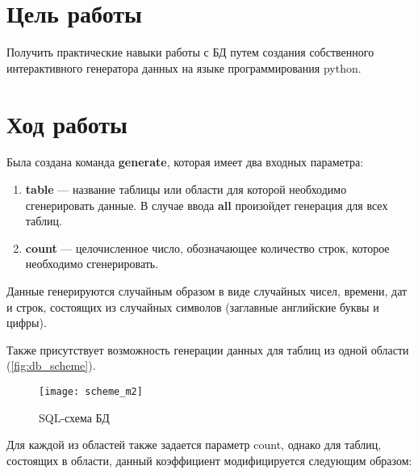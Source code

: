 \section{Цель работы}
Получить практические навыки работы с БД путем создания собственного интерактивного генератора
данных на языке программирования python.

\section{Ход работы}
Была создана команда \textbf{generate}, которая имеет два входных параметра:

\begin{enumerate}
	\item \textbf{table} --- название таблицы или области для которой необходимо сгенерировать данные. В случае ввода \textbf{all} произойдет генерация для всех таблиц.
	\item \textbf{count} --- целочисленное число, обозначающее количество строк, которое необходимо сгенерировать.
\end{enumerate}

Данные генерируются случайным образом в виде случайных чисел, времени, дат и строк, состоящих из случайных символов (заглавные английские буквы и цифры).

Также присутствует возможность генерации данных для таблиц из одной области (\vref{fig:db_scheme}).

\begin{figure}[H]
	\centering
	\texttt{[image: scheme\_m2]}
	\caption{SQL-схема БД}
	\label{fig:db_scheme}
\end{figure}

Для каждой из областей также задается параметр count, однако для таблиц, состоящих в области, данный коэффициент модифицируется следующим образом:

